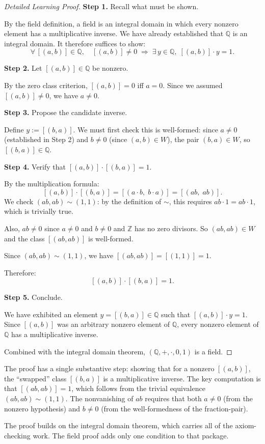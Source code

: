 \begin{proof}[Detailed Learning Proof]
\LRAProofBodyStart

\textbf{Step 1.} Recall what must be shown.

By the field definition, a field is an integral domain in which every
nonzero element has a multiplicative inverse. We have already established
that $\mathbb{Q}$ is an integral domain. It therefore suffices to show:
\[
\forall\, [(a,b)]\in\mathbb{Q},\quad [(a,b)]\neq 0
\;\Longrightarrow\;
\exists\, y\in\mathbb{Q},\; [(a,b)]\cdot y = 1.
\]

\textbf{Step 2.} Let $[(a,b)]\in\mathbb{Q}$ be nonzero.

By the zero class criterion, $[(a,b)] = 0$ iff $a = 0$. Since we assumed
$[(a,b)]\neq 0$, we have $a\neq 0$.

\textbf{Step 3.} Propose the candidate inverse.

Define $y := [(b,a)]$. We must first check this is well-formed: since
$a\neq 0$ (established in Step 2) and $b\neq 0$ (since $(a,b)\in W$),
the pair $(b,a)\in W$, so $[(b,a)]\in\mathbb{Q}$.

\textbf{Step 4.} Verify that $[(a,b)]\cdot[(b,a)] = 1$.

By the multiplication formula:
\[
[(a,b)]\cdot[(b,a)]
= [(a\cdot b,\; b\cdot a)]
= [(ab,\; ab)].
\]
We check $(ab,ab)\sim(1,1)$: by the definition of $\sim$, this requires
$ab\cdot 1 = ab\cdot 1$, which is trivially true.

Also, $ab\neq 0$ since $a\neq 0$ and $b\neq 0$ and $\mathbb{Z}$ has no
zero divisors. So $(ab,ab)\in W$ and the class $[(ab,ab)]$ is well-formed.

Since $(ab,ab)\sim(1,1)$, we have $[(ab,ab)] = [(1,1)] = 1$.

Therefore:
\[
[(a,b)]\cdot[(b,a)] = 1.
\]

\textbf{Step 5.} Conclude.

We have exhibited an element $y = [(b,a)]\in\mathbb{Q}$ such that
$[(a,b)]\cdot y = 1$. Since $[(a,b)]$ was an arbitrary nonzero element
of $\mathbb{Q}$, every nonzero element of $\mathbb{Q}$ has a multiplicative
inverse.

Combined with the integral domain theorem, $(\mathbb{Q},+,\cdot,0,1)$ is
a field.
\end{proof}

\begin{remark*}
The proof has a single substantive step: showing that for a nonzero
$[(a,b)]$, the ``swapped'' class $[(b,a)]$ is a multiplicative inverse.
The key computation is that $[(ab,ab)] = 1$, which follows from the
trivial equivalence $(ab,ab)\sim(1,1)$. The nonvanishing of $ab$ requires
that both $a\neq 0$ (from the nonzero hypothesis) and $b\neq 0$ (from the
well-formedness of the fraction-pair).

The proof builds on the integral domain theorem, which carries all of the
axiom-checking work. The field proof adds only one condition to that package.
\end{remark*}

